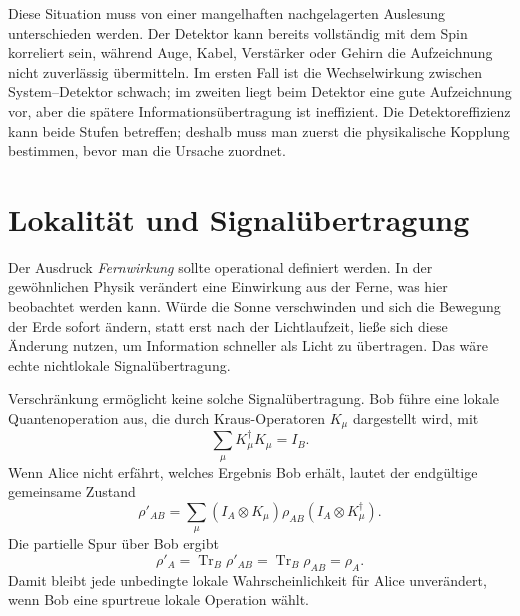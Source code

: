 Diese Situation muss von einer mangelhaften nachgelagerten Auslesung unterschieden werden. Der Detektor kann bereits vollständig mit dem Spin korreliert sein, während Auge, Kabel, Verstärker oder Gehirn die Aufzeichnung nicht zuverlässig übermitteln. Im ersten Fall ist die Wechselwirkung zwischen System--Detektor schwach; im zweiten liegt beim Detektor eine gute Aufzeichnung vor, aber die spätere Informationsübertragung ist ineffizient. Die Detektoreffizienz kann beide Stufen betreffen; deshalb muss man zuerst die physikalische Kopplung bestimmen, bevor man die Ursache zuordnet.

\begin{classroomqa}
\end{classroomqa}

\section{Lokalität und Signalübertragung}

Der Ausdruck \emph{Fernwirkung} sollte operational definiert werden. In der gewöhnlichen Physik verändert eine Einwirkung aus der Ferne, was hier beobachtet werden kann. Würde die Sonne verschwinden und sich die Bewegung der Erde sofort ändern, statt erst nach der Lichtlaufzeit, ließe sich diese Änderung nutzen, um Information schneller als Licht zu übertragen. Das wäre echte nichtlokale Signalübertragung.

Verschränkung ermöglicht keine solche Signalübertragung. Bob führe eine lokale Quantenoperation aus, die durch Kraus-Operatoren \(K_\mu\) dargestellt wird, mit
\begin{equation}
\sum_\mu K_\mu^\dagger K_\mu=I_B.
\end{equation}
Wenn Alice nicht erfährt, welches Ergebnis Bob erhält, lautet der endgültige gemeinsame Zustand
\begin{equation}
\rho'_{AB}
=\sum_\mu
(I_A\otimes K_\mu)\rho_{AB}
(I_A\otimes K_\mu^\dagger).
\end{equation}
Die partielle Spur über Bob ergibt
\begin{equation}
\rho'_A
=\operatorname{Tr}_B\rho'_{AB}
=\operatorname{Tr}_B\rho_{AB}
=\rho_A.
\label{eq:l7-no-signaling}
\end{equation}
Damit bleibt jede unbedingte lokale Wahrscheinlichkeit für Alice unverändert, wenn Bob eine spurtreue lokale Operation wählt.

